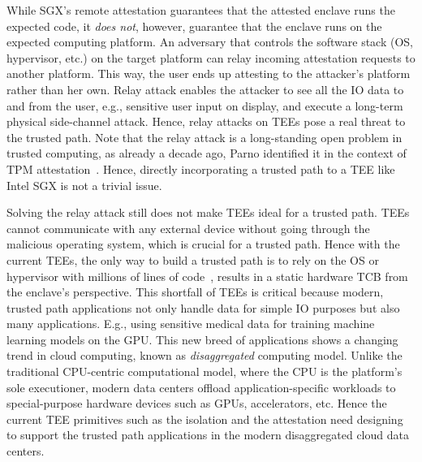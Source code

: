 While SGX's remote attestation guarantees that the attested enclave runs the expected code, it \emph{does not}, however, guarantee that the enclave runs on the expected computing platform. An adversary that controls the software stack (OS, hypervisor, etc.) on the target platform can relay incoming attestation requests to another platform. This way, the user ends up attesting to the attacker's platform rather than her own. Relay attack enables the attacker to see all the IO data to and from the user, e.g., sensitive user input on display, and execute a long-term physical side-channel attack. Hence, relay attacks on TEEs pose a real threat to the trusted path. Note that the relay attack is a long-standing open problem in trusted computing, as already a decade ago, Parno identified it in the context of TPM attestation~\cite{parno2008bootstrapping}. Hence, directly incorporating a trusted path to a TEE like Intel SGX is not a trivial issue.


Solving the relay attack still does not make TEEs ideal for a trusted path. TEEs cannot communicate with any external device without going through the malicious operating system, which is crucial for a trusted path. Hence with the current TEEs, the only way to build a trusted path is to rely on the OS or hypervisor with millions of lines of code~\cite{torvalds2020linux,barham2003xen}, results in a static hardware TCB from the enclave's perspective. This shortfall of TEEs is critical because modern, trusted path applications not only handle data for simple IO purposes but also many applications. E.g., using sensitive medical data for training machine learning models on the GPU. This new breed of applications shows a changing trend in cloud computing, known as \emph{disaggregated} computing model. Unlike the traditional CPU-centric computational model, where the CPU is the platform's sole executioner, modern data centers offload application-specific workloads to special-purpose hardware devices such as GPUs, accelerators, etc. Hence the current TEE primitives such as the isolation and the attestation need designing to support the trusted path applications in the modern disaggregated cloud data centers.   